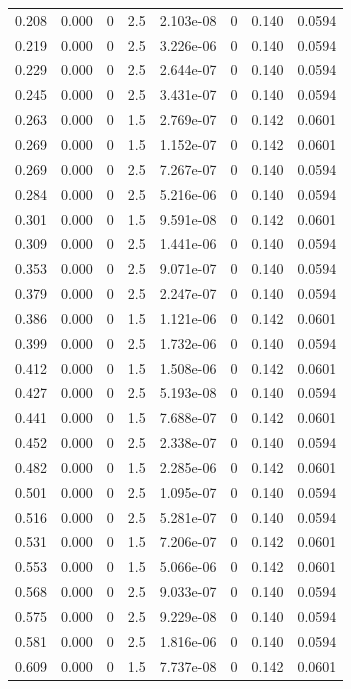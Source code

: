 \documentclass[preview]{standalone}
\begin{document}
{{\begin{tabular}{L{1.2cm}C{1.2cm} C{0.3cm}C{0.5cm} C{1.4cm}C{1.4cm} C{1.4cm}C{1.4cm}}
  0.208  &  0.000  & 0     & 2.5 &  2.103e-08  & 0  & 0.140 &  0.0594   \\ 
  0.219  &  0.000  & 0     & 2.5 &  3.226e-06  & 0  & 0.140 &  0.0594   \\ 
  0.229  &  0.000  & 0     & 2.5 &  2.644e-07  & 0  & 0.140 &  0.0594   \\ 
  0.245  &  0.000  & 0     & 2.5 &  3.431e-07  & 0  & 0.140 &  0.0594   \\ 
  0.263  &  0.000  & 0     & 1.5 &  2.769e-07  & 0  & 0.142 &  0.0601   \\ 
  0.269  &  0.000  & 0     & 1.5 &  1.152e-07  & 0  & 0.142 &  0.0601   \\ 
  0.269  &  0.000  & 0     & 2.5 &  7.267e-07  & 0  & 0.140 &  0.0594   \\ 
  0.284  &  0.000  & 0     & 2.5 &  5.216e-06  & 0  & 0.140 &  0.0594   \\ 
  0.301  &  0.000  & 0     & 1.5 &  9.591e-08  & 0  & 0.142 &  0.0601   \\ 
  0.309  &  0.000  & 0     & 2.5 &  1.441e-06  & 0  & 0.140 &  0.0594   \\ 
  0.353  &  0.000  & 0     & 2.5 &  9.071e-07  & 0  & 0.140 &  0.0594   \\ 
  0.379  &  0.000  & 0     & 2.5 &  2.247e-07  & 0  & 0.140 &  0.0594   \\ 
  0.386  &  0.000  & 0     & 1.5 &  1.121e-06  & 0  & 0.142 &  0.0601   \\ 
  0.399  &  0.000  & 0     & 2.5 &  1.732e-06  & 0  & 0.140 &  0.0594   \\ 
  0.412  &  0.000  & 0     & 1.5 &  1.508e-06  & 0  & 0.142 &  0.0601   \\ 
  0.427  &  0.000  & 0     & 2.5 &  5.193e-08  & 0  & 0.140 &  0.0594   \\ 
  0.441  &  0.000  & 0     & 1.5 &  7.688e-07  & 0  & 0.142 &  0.0601   \\ 
  0.452  &  0.000  & 0     & 2.5 &  2.338e-07  & 0  & 0.140 &  0.0594   \\ 
  0.482  &  0.000  & 0     & 1.5 &  2.285e-06  & 0  & 0.142 &  0.0601   \\ 
  0.501  &  0.000  & 0     & 2.5 &  1.095e-07  & 0  & 0.140 &  0.0594   \\ 
  0.516  &  0.000  & 0     & 2.5 &  5.281e-07  & 0  & 0.140 &  0.0594   \\ 
  0.531  &  0.000  & 0     & 1.5 &  7.206e-07  & 0  & 0.142 &  0.0601   \\ 
  0.553  &  0.000  & 0     & 1.5 &  5.066e-06  & 0  & 0.142 &  0.0601   \\ 
  0.568  &  0.000  & 0     & 2.5 &  9.033e-07  & 0  & 0.140 &  0.0594   \\ 
  0.575  &  0.000  & 0     & 2.5 &  9.229e-08  & 0  & 0.140 &  0.0594   \\ 
  0.581  &  0.000  & 0     & 2.5 &  1.816e-06  & 0  & 0.140 &  0.0594   \\ 
  0.609  &  0.000  & 0     & 1.5 &  7.737e-08  & 0  & 0.142 &  0.0601   \\ 
\hline 
\end{tabular} 

}}
\end{document}
